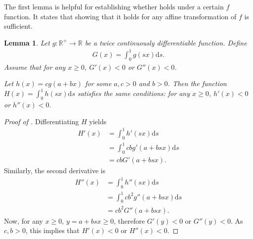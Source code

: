 \documentclass[a4paper]{article}
\newtheorem{lemma}{Lemma}
\newcommand{\ds}{\mathrm{d}s}
\begin{document}
The first lemma is helpful for establishing whether  holds under a certain $f$ function.
It states that showing that it holds for any affine transformation of $f$ is sufficient.
\begin{lemma}
    \label{lem:single_crossing_affine_transformation}
    Let $g: \mathbb{R}^+ \to \mathbb{R}$ be a twice continuously differentiable function.
    Define
    \begin{align*}
        G(x) = \int_0^1 g(sx) \ds.
    \end{align*}
    Assume that for any $x \geq 0$, $G'(x) < 0$ or $G''(x) < 0$.

    Let $h(x) = c g(a + bx)$ for some $a, c > 0$ and $b > 0$.
    Then the function $H(x) = \int_0^1 h(sx) \ds$ satisfies the same conditions: for any $x \geq 0$, $h'(x) < 0$ or $h''(x) < 0$.
\end{lemma}
\begin{proof}[Proof of ]
    Differentiating $H$ yields
    \begin{align*}
        H'(x) &= \int_0^1 h'(sx) \ds \\
              &= \int_0^1 c b g'(a + bsx) \ds \\
              &= c b G'(a + bsx).
    \end{align*}
    Similarly, the second derivative is
    \begin{align*}
        H''(x) &= \int_0^1 h''(sx) \ds \\
               &= \int_0^1 c b^2 g''(a + bsx) \ds \\
               &= c b^2 G''(a + bsx).
    \end{align*}
    Now, for any $x \geq 0$, $y = a + bsx \geq 0$, therefore $G'(y) < 0$ or $G''(y) < 0$.
    As $c, b > 0$, this implies that $H'(x) < 0$ or $H''(x) < 0$.
\end{proof}
\end{document}
